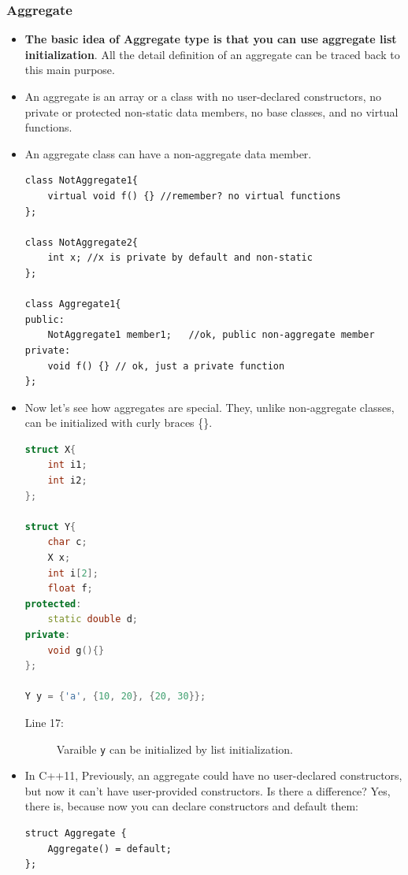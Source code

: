 \documentclass[a4paper,11pt,twoside]{book}
\begin{document}
\subsubsection{Aggregate}
\begin{itemize}
	\item \textbf{The basic idea of Aggregate type is that you can use aggregate list initialization}. All the detail definition of an aggregate can be traced back to this main purpose. 
	
	\item An aggregate is an array or a class with no user-declared constructors, no private or protected non-static data members, no base classes, and no virtual functions.
	
	\item  An aggregate class can have a non-aggregate data member.
\begin{lstlisting}[numbers=none]
class NotAggregate1{
	virtual void f() {} //remember? no virtual functions
};
	
class NotAggregate2{
	int x; //x is private by default and non-static 
};
	
class Aggregate1{
public:
	NotAggregate1 member1;   //ok, public non-aggregate member
private:
	void f() {} // ok, just a private function
};
\end{lstlisting}
	
	\item Now let's see how aggregates are special. They, unlike non-aggregate classes, can be initialized with curly braces \{\}. 
\begin{lstlisting}[frame=single, language=c++]
struct X{
	int i1;
	int i2;
};
	
struct Y{
	char c;
	X x;
	int i[2];
	float f; 
protected:
	static double d;
private:
	void g(){}      
}; 
	
Y y = {'a', {10, 20}, {20, 30}};
\end{lstlisting}
\begin{description}
	\item[Line 17:] Varaible \texttt{y} can be initialized by list initialization. 
\end{description}
	
	\item In C++11, Previously, an aggregate could have no user-declared constructors, but now it can't have user-provided constructors. Is there a difference? Yes, there is, because now you can declare constructors and default them:
\begin{lstlisting}[numbers=none]
struct Aggregate {
	Aggregate() = default; 
};
\end{lstlisting}
	

\end{itemize}
\end{document}
